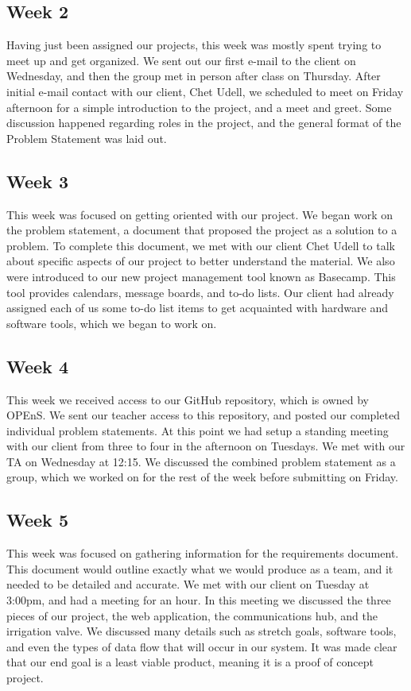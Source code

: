 \documentclass[onecolumn, draftclsnofoot,10pt, compsoc]{IEEEtran}
\begin{document}
    \subsection{Week 2}
    Having just been assigned our projects, this week was mostly spent trying to meet up and get organized.
    We sent out our first e-mail to the client on Wednesday, and then the group met in person after class on Thursday.
    After initial e-mail contact with our client, Chet Udell, we scheduled to meet on Friday afternoon for a simple introduction to the project, and a meet and greet.
    Some discussion happened regarding roles in the project, and the general format of the Problem Statement was laid out.
    \subsection{Week 3}
    This week was focused on getting oriented with our project. 
    We began work on the problem statement, a document that proposed the project as a solution to a problem. 
    To complete this document, we met with our client Chet Udell to talk about specific aspects of our project to better understand the material. 
    We also were introduced to our new project management tool known as Basecamp.
    This tool provides calendars, message boards, and to-do lists. 
    Our client had already assigned each of us some to-do list items to get acquainted with hardware and software tools, which we began to work on. 
    
    \subsection{Week 4}
    This week we received access to our GitHub repository, which is owned by OPEnS.
    We sent our teacher access to this repository, and posted our completed individual problem statements. 
    At this point we had setup a standing meeting with our client from three to four in the afternoon on Tuesdays. 
    We met with our TA on Wednesday at 12:15. 
    We discussed the combined problem statement as a group, which we worked on for the rest of the week before submitting on Friday. 
    
    
    \subsection{Week 5}
    This week was focused on gathering information for the requirements document.
    This document would outline exactly what we would produce as a team, and it needed to be detailed and accurate. 
    We met with our client on Tuesday at 3:00pm, and had a meeting for an hour. 
    In this meeting we discussed the three pieces of our project, the web application, the communications hub, and the irrigation valve. 
    We discussed many details such as stretch goals, software tools, and even the types of data flow that will occur in our system. 
    It was made clear that our end goal is a least viable product, meaning it is a proof of concept project. 
\end{document}
